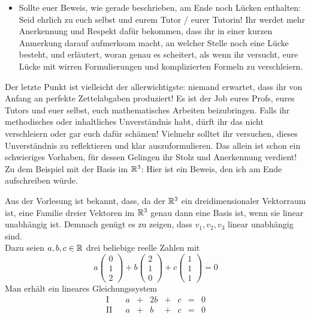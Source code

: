 \begin{de}
\begin{itemize}
        \item Sollte euer Beweis, wie gerade beschrieben, am Ende noch Lücken enthalten: Seid ehrlich zu euch selbst und eurem Tutor / eurer Tutorin! Ihr werdet mehr Anerkennung und Respekt dafür bekommen, dass ihr in einer kurzen Anmerkung darauf aufmerksam macht, an welcher Stelle noch eine Lücke besteht, und erläutert, woran genau es scheitert, als wenn ihr versucht, eure Lücke mit wirren Formulierungen und komplizierten Formeln zu verschleiern.
    \end{itemize}
    Der letzte Punkt ist vielleicht der allerwichtigste: niemand erwartet, dass ihr von Anfang an perfekte Zettelabgaben produziert! Es ist der Job eures Profs,  eures Tutors und euer selbst, euch mathematisches Arbeiten beizubringen. Falls ihr methodisches oder inhaltliches Unverständnis habt, dürft ihr das nicht verschleiern oder gar euch dafür schämen! Vielmehr solltet ihr versuchen, dieses Unverständnis zu reflektieren und klar auszuformulieren. Das allein ist schon ein schwieriges Vorhaben, für dessen Gelingen ihr Stolz und Anerkennung verdient! \\[0.5em]
    Zu dem Beispiel mit der Basis im $\mathbb R^3$: Hier ist ein Beweis, den ich am Ende aufschreiben würde.
    \begin{bew}
        Aus der Vorlesung ist bekannt, dass, da der $\mathbb R^3$ ein dreidimensionaler Vektorraum ist, eine Familie dreier Vektoren im $\mathbb R^3$ genau dann eine Basis ist, wenn sie linear unabhängig ist. Demnach genügt es zu zeigen, dass $v_1,v_2,v_3$ linear unabhängig sind. \\[0.5em]
        Dazu seien $a,b,c\in \mathbb R$ drei beliebige reelle Zahlen mit
            \[ a\begin{pmatrix} 0 \\ 1 \\ 2 \end{pmatrix} + b \begin{pmatrix} 2 \\ 1 \\ 0 \end{pmatrix}+c \begin{pmatrix} 1 \\ 1 \\ 1 \end{pmatrix} = 0  \]
        Man erhält ein lineares Gleichungssystem
        \[\begin{array}{rcccccccc}
            \text{I} &&    a &+& 2b &+& c &=& 0 \\
            \text{II}&& a &+& b &+& c & =& 0 \\

\end{array}\]
\end{bew}
\end{de}
